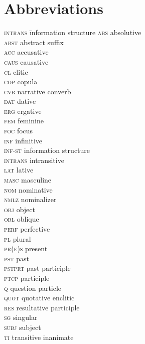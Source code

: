 \documentclass[output=paper
,modfonts
,nonflat]{langsci/langscibook}
\begin{document}
	\section*{Abbreviations}
	\begin{multicols}{2}
		\begin{tabbing}
			\textsc{intrans}\hspace{5mm} \= information structure\kill
			\textsc{abs} \> absolutive\\ 
			\textsc{abst} \> abstract suffix\\ 
			\textsc{acc} \> accusative\\
			\textsc{caus} \> causative\\ 
			\textsc{cl} \> clitic\\ 
			\textsc{cop} \> copula\\ 
			\textsc{cvb} \> narrative converb\\ 
			\textsc{dat} \> dative\\ 
			\textsc{erg} \> ergative\\ 
			\textsc{fem} \> feminine\\ 
			\textsc{foc} \> focus\\ 
			\textsc{inf} \> infinitive\\ 
			\textsc{inf-st} \> information structure\\ 
			\textsc{intrans} \> intransitive\\ 
			\textsc{lat} \> lative\\ 
			\textsc{masc} \> masculine\\ 
			\textsc{nom} \> nominative\\ 
			\textsc{nmlz} \> nominalizer\\ 
			\textsc{obj} \> object\\ 
			\textsc{obl} \> oblique\\
			\textsc{perf} \> perfective\\
			\textsc{pl} \> plural\\ 
			\textsc{pr(e)s} \> present\\ 
			\textsc{pst} \> past\\ 
			\textsc{pstprt} \> past participle\\
			\textsc{ptcp} \> participle\\ 
			\textsc{q} \> question particle\\ 
			\textsc{quot} \> quotative enclitic\\
			\textsc{res} \> resultative participle\\ 
			\textsc{sg} \> singular\\ 
			\textsc{subj} \> subject\\ 
			\textsc{ti} \> transitive inanimate
		\end{tabbing} 
	\end{multicols}
	
\end{document}
